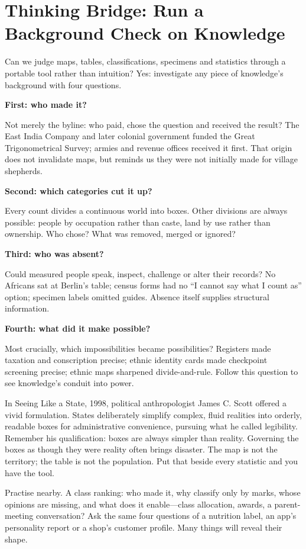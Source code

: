 \section[Thinking Bridge: Knowledge's Origins]{Thinking Bridge: Run a Background Check on Knowledge}
Can we judge maps, tables, classifications, specimens and statistics through a portable tool rather than intuition? Yes: investigate any piece of knowledge's background with four questions.

\textbf{First: who made it?}

Not merely the byline: who paid, chose the question and received the result? The East India Company and later colonial government funded the Great Trigonometrical Survey; armies and revenue offices received it first. That origin does not invalidate maps, but reminds us they were not initially made for village shepherds.

\textbf{Second: which categories cut it up?}

Every count divides a continuous world into boxes. Other divisions are always possible: people by occupation rather than caste, land by use rather than ownership. Who chose? What was removed, merged or ignored?

\textbf{Third: who was absent?}

Could measured people speak, inspect, challenge or alter their records? No Africans sat at Berlin's table; census forms had no ``I cannot say what I count as'' option; specimen labels omitted guides. Absence itself supplies structural information.

\textbf{Fourth: what did it make possible?}

Most crucially, which impossibilities became possibilities? Registers made taxation and conscription precise; ethnic identity cards made checkpoint screening precise; ethnic maps sharpened divide-and-rule. Follow this question to see knowledge's conduit into power.

In Seeing Like a State, 1998, political anthropologist James C. Scott offered a vivid formulation. States deliberately simplify complex, fluid realities into orderly, readable boxes for administrative convenience, pursuing what he called legibility. Remember his qualification: boxes are always simpler than reality. Governing the boxes as though they were reality often brings disaster. The map is not the territory; the table is not the population. Put that beside every statistic and you have the tool.

Practise nearby. A class ranking: who made it, why classify only by marks, whose opinions are missing, and what does it enable---class allocation, awards, a parent-meeting conversation? Ask the same four questions of a nutrition label, an app's personality report or a shop's customer profile. Many things will reveal their shape.

